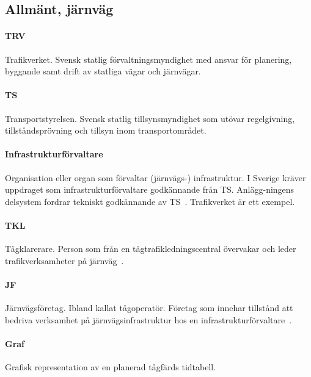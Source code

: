 \subsection{Allmänt, järnväg}\label{subsec:allmant-jarnvag}

\paragraph{TRV}
Trafikverket.
Svensk statlig förvaltningsmyndighet med ansvar för planering, byggande samt drift av statliga vägar och järnvägar.
\paragraph{TS}
Transportstyrelsen.
Svensk statlig tillsynsmyndighet som utövar regelgivning, tillståndsprövning och tillsyn inom transportområdet.
\paragraph{Infrastrukturförvaltare}
Organisation eller organ som förvaltar (järnvägs-) infrastruktur.
I Sverige kräver uppdraget som infrastrukturförvaltare godkännande från TS\@.
Anlägg-ningens delsystem fordrar tekniskt godkännande av TS~\cite{Infrastrukturforvaltare2024}.
Trafikverket är ett exempel.
\paragraph{TKL}
Tågklarerare.
Person som från en tågtrafikledningscentral övervakar och leder trafikverksamheter på järnväg~\cite{TTJ2015}.
\paragraph{JF}
Järnvägsföretag.
Ibland kallat tågoperatör.
Företag som innehar tillstånd att bedriva verksamhet på järnvägsinfrastruktur hos en infrastrukturförvaltare~\cite{Jarnvagsforetag2024}.
\paragraph{Graf}
Grafisk representation av en planerad tågfärds tidtabell.

